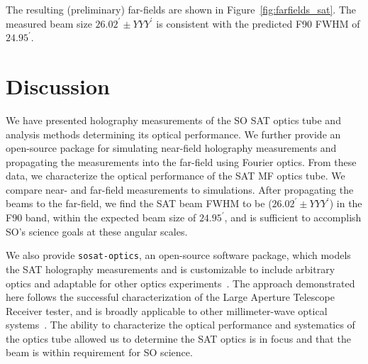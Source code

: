 The resulting (preliminary) far-fields are shown in Figure~\ref{fig:farfields_sat}.  The measured beam size $26.02^{\prime}\pm YYY^{\prime}$ is consistent with the predicted F90 FWHM of $24.95^{\prime}$.

\section{Discussion}
\label{sec:sat_discussion}

We have presented holography measurements of the SO SAT optics tube and analysis methods determining its optical performance.  We further provide an open-source package for simulating near-field holography measurements and propagating the measurements into the far-field using Fourier optics.  From these data, we characterize the optical performance of the SAT MF optics tube.  We compare near- and far-field measurements to simulations.  After propagating the beams to the far-field, we find the SAT beam FWHM to be ($26.02^{\prime}\pm YYY^{\prime}$) in the F90 band, within the expected beam size of $24.95^{\prime}$, and is sufficient to accomplish SO's science goals at these angular scales.

We also provide \verb|sosat-optics|, an open-source software package, which models the SAT holography measurements and is customizable to include arbitrary optics and adaptable for other optics experiments~\cite{sat_sim_model}.  The approach demonstrated here follows the successful characterization of the Large Aperture Telescope Receiver tester, and is broadly applicable to other millimeter-wave optical systems~\cite{chesmore2022}.  The ability to characterize the optical performance and systematics of the optics tube allowed us to determine the SAT optics is in focus and that the beam is within requirement for SO science. 

